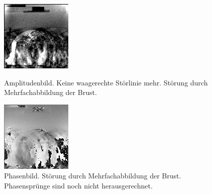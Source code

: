 \documentclass[
    11pt,
    ngerman
]{scrbook}
\begin{document}
\begin{figure}
    \begin{minipage}[htbp]{.45\textwidth}
        \centering
        \includegraphics[width=\textwidth]{Abbildungen/2015-02-27_25_1_amp_kontrast.png}
        \caption{Amplitudenbild. Keine waagerechte Störlinie mehr. Störung durch Mehrfachabbildung der Brust.}
        \label{fig:2015-02-27_25_1_amp}
    \end{minipage}
    \hfill
    \begin{minipage}[htbp]{.45\textwidth}
        \centering
        \includegraphics[width=\textwidth]{Abbildungen/2015-02-27_26_1_phase.png}
        \caption{Phasenbild. Störung durch Mehrfachabbildung der Brust. Phasensprünge sind noch nicht herausgerechnet.}
        \label{fig:2015-02-27_26_1_phase}
    \end{minipage}
\end{figure}
\end{document}
